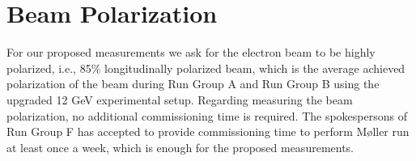 \section{Beam Polarization}
For our proposed measurements we ask for the electron beam to be highly 
polarized, i.e., 85\% longitudinally polarized beam, which is the average 
achieved polarization of the beam during Run Group A and Run Group B using the 
upgraded 12 GeV experimental setup. Regarding measuring the beam polarization, 
no additional commissioning time is required. The spokespersons of Run Group F 
\cite{skuhn} has accepted to provide commissioning time to perform M{\o}ller 
run at least once a week, which is enough for the proposed measurements.    

